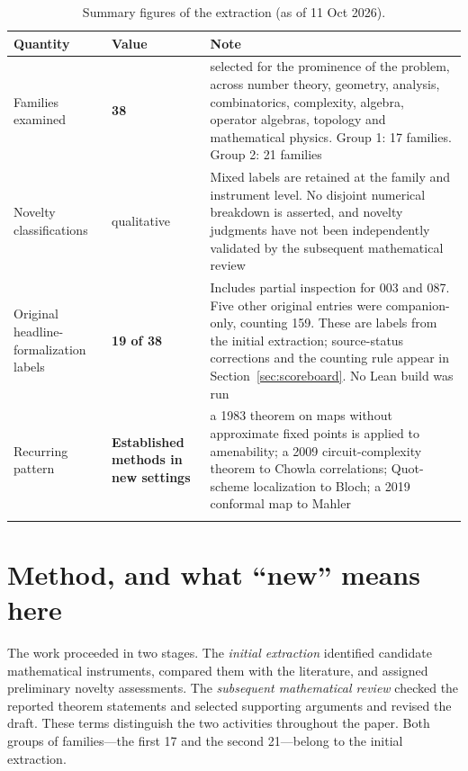 \documentclass[11pt]{article}
\begin{document}
\begin{table}[ht]\centering\small
\begin{tabular}{@{}>{\raggedright\arraybackslash}p{}>{\raggedright\arraybackslash}p{}>{\raggedright\arraybackslash}p{}@{}}
\toprule
\textbf{Quantity} & \textbf{Value} & \textbf{Note}\\ \midrule
Families examined & \textbf{38} & selected for the prominence of the problem, across number theory, geometry, analysis, combinatorics, complexity, algebra, operator algebras, topology and mathematical physics. Group 1: 17 families. Group 2: 21 families \\ \addlinespace
Novelty classifications & qualitative & Mixed labels are retained at the family and instrument level. No disjoint numerical breakdown is asserted, and novelty judgments have not been independently validated by the subsequent mathematical review \\ \addlinespace
Original headline-formalization labels & \textbf{19 of 38} & Includes partial inspection for 003 and 087. Five other original entries were companion-only, counting 159. These are labels from the initial extraction; source-status corrections and the counting rule appear in Section~\ref{sec:scoreboard}. No Lean build was run \\ \addlinespace
Recurring pattern & \textbf{Established methods in new settings} & a 1983 theorem on maps without approximate fixed points is applied to amenability; a 2009 circuit-complexity theorem to Chowla correlations; Quot-scheme localization to Bloch; a 2019 conformal map to Mahler \\ \addlinespace
\bottomrule
\end{tabular}
\caption{Summary figures of the extraction (as of 11 Oct 2026).}\label{tab:glance}
\end{table}
\section{\texorpdfstring{Method, and what ``new'' means here}{Method, and what new means here}}\label{sec:method}

The work proceeded in two stages. The \emph{initial extraction} identified candidate mathematical instruments, compared them with the literature, and assigned preliminary novelty assessments. The \emph{subsequent mathematical review} checked the reported theorem statements and selected supporting arguments and revised the draft. These terms distinguish the two activities throughout the paper. Both groups of families---the first 17 and the second 21---belong to the initial extraction.
\end{document}
